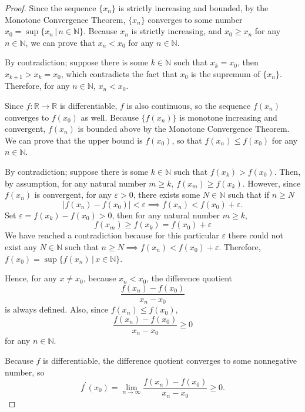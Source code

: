\documentclass[12pt]{article}
\newcommand{\N}{\ensuremath{\mathbb{N}}}
\newcommand{\R}{\ensuremath{\mathbb{R}}}
\begin{document}
\begin{proof}
  Since the sequence $\{x_n\}$ is strictly increasing and bounded, by the Monotone Convergence Theorem, $\{x_n\}$ converges to some number $x_0 = \sup \{x_n \,|\, n \in \N\}$. Because $x_n$ is strictly increasing, and $x_0 \geq x_n$ for any $n \in \N$, we can prove that $x_n < x_0$ for any $n \in \N$.

  By contradiction; suppose there is some $k \in \N$ such that $x_k = x_0$, then $x_{k+1} > x_k = x_0$, which contradicts the fact that $x_0$ is the supremum of $\{x_n\}$. Therefore, for any $n \in \N$, $x_n < x_0$.

  Since $f:\R \rightarrow \R$ is differentiable, $f$ is also continuous, so the sequence $f(x_n)$ converges to $f(x_0)$ as well. Because $\{f(x_n)\}$ is monotone increasing and convergent, $f(x_n)$ is bounded above by the Monotone Convergence Theorem. We can prove that the upper bound is $f(x_0)$, so that $f(x_n) \leq f(x_0)$ for any $n \in \N$.

  By contradiction; suppose there is some $k \in \N$ such that $f(x_k) > f(x_0)$. Then, by assumption, for any natural number $m \geq k$, $f(x_m) \geq f(x_k)$. However, since $f(x_n)$ is convergent, for any $\varepsilon > 0$, there exists some $N\in \N$ such that if $n \geq N$
  \begin{equation*}
    |f(x_n) - f(x_0)| < \varepsilon \implies f(x_n)< f(x_0) + \varepsilon.
  \end{equation*}
  Set $\varepsilon = f(x_k) - f(x_0) > 0$, then for any natural number $m \geq k$,
  \begin{equation*}
    f(x_m) \geq f(x_k) = f(x_0) + \varepsilon
  \end{equation*}
  We have reached a contradiction because for this particular $\varepsilon$ there could not exist any $N \in \N$ such that $n \geq N \implies f(x_n)< f(x_0)+\varepsilon$.
  Therefore, $f(x_0) = \sup \{f(x_n) \,|\, x \in \N\}$.

  Hence, for any $x \not=x_0$, because $x_n < x_0$, the difference quotient
  \begin{equation*}
    \frac{f(x_n)-f(x_0)}{x_n-x_0}
  \end{equation*}
  is always defined. Also, since $f(x_n) \leq f(x_0)$,
  \begin{equation*}
    \frac{f(x_n)-f(x_0)}{x_n-x_0} \geq 0
  \end{equation*}
  for any $n \in \N$.

  Because $f$ is differentiable, the difference quotient converges to some nonnegative number, so
  \begin{equation*}
    f^\prime(x_0) = \lim_{n \to \infty} \frac{f(x_n)-f(x_0)}{x_n-x_0} \geq 0.
  \end{equation*}
\end{proof}
\end{document}

